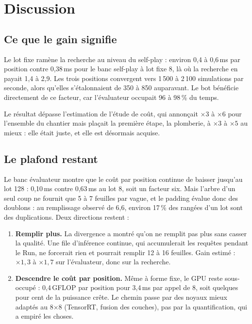 \section{Discussion}

\subsection{Ce que le gain signifie}

Le lot fixe ram\`ene la recherche au niveau du self-play : environ 0,4 \`a
0,6\,ms par position contre 0,38\,ms pour le banc self-play \`a lot fixe 8,
l\`a o\`u la recherche en payait 1,4 \`a 2,9. Les trois positions convergent
vers 1\,500 \`a 2\,100 simulations par seconde, alors qu'elles s'\'etalonnaient
de 350 \`a 850 auparavant. Le bot b\'en\'eficie directement de ce facteur, car
l'\'evaluateur occupait 96 \`a 98\,\% du temps.

Le r\'esultat d\'epasse l'estimation de l'\'etude de co\^ut, qui annon\c cait
$\times 3$ \`a $\times 6$ pour l'ensemble du chantier mais pla\c cait la
premi\`ere \'etape, la plomberie, \`a $\times 3$ \`a $\times 5$ au mieux : elle
\'etait juste, et elle est d\'esormais acquise.

\subsection{Le plafond restant}

Le banc \'evaluateur montre que le co\^ut par position continue de baisser
jusqu'au lot 128 : 0,10\,ms contre 0,63\,ms au lot 8, soit un facteur six. Mais
l'arbre d'un seul coup ne fournit que 5 \`a 7 feuilles par vague, et le
padding \'evalue donc des doublons : au remplissage observ\'e de 6,6, environ
17\,\% des rang\'ees d'un lot sont des duplications. Deux directions restent :

\begin{enumerate}[leftmargin=1.4em,itemsep=3pt]
  \item \textbf{Remplir plus.} La divergence a montr\'e qu'on ne remplit pas
  plus sans casser la qualit\'e. Une file d'inf\'erence continue, qui
  accumulerait les requ\^etes pendant le Run, ne forcerait rien et pourrait
  remplir 12 \`a 16 feuilles. Gain estim\'e : $\times 1{,}3$ \`a $\times 1{,}7$
  sur l'\'evaluateur, donc sur la recherche.
  \item \textbf{Descendre le co\^ut par position.} M\^eme \`a forme fixe, le
  GPU reste sous-occup\'e : 0,4\,GFLOP par position pour 3,4\,ms par appel de
  8, soit quelques pour cent de la puissance cr\^ete. Le chemin passe par des
  noyaux mieux adapt\'es au 8$\times$8 (TensorRT, fusion des couches), pas par
  la quantification, qui a empir\'e les choses.
\end{enumerate}

